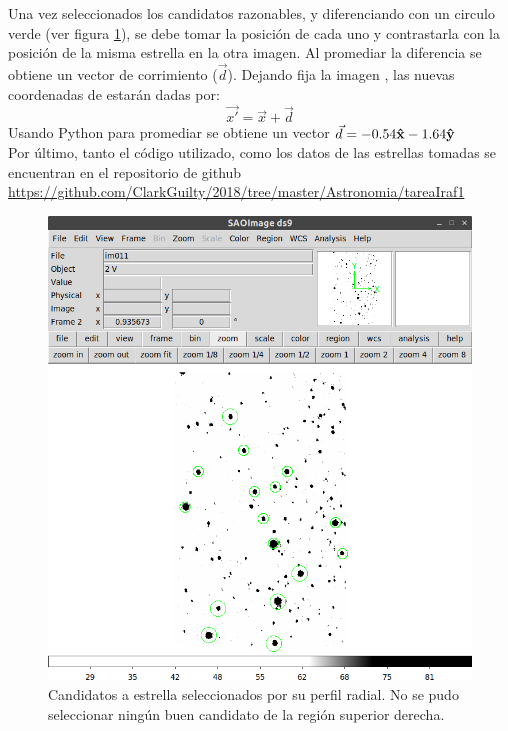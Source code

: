 \documentclass[12pt]{article}
\begin{document}
Una vez seleccionados los candidatos razonables, y diferenciando con un circulo verde (ver figura \ref{im07}), se debe tomar la posición de cada uno y contrastarla con la posición de la misma estrella en la otra imagen. Al promediar la diferencia se obtiene un vector de corrimiento ($\vec{d}$). Dejando fija la imagen , las nuevas coordenadas de  estarán dadas por:
\begin{equation}
\vec{x'}= \vec{x} + \vec{d}
\end{equation}
Usando Python para promediar se obtiene un vector $\vec{d} = -0.54\vu{x} -1.64\vu{y}$\\
Por último, tanto el código utilizado, como los datos de las estrellas tomadas se  encuentran en el repositorio de github \url{https://github.com/ClarkGuilty/2018/tree/master/Astronomia/tareaIraf1}

\begin{figure}[H]
  \centering
   \includegraphics[scale= 0.65]{im07.png}
  \caption{Candidatos a estrella seleccionados por su perfil radial. No se pudo seleccionar ningún buen candidato de la región superior derecha.}
  \label{im07}
\end{figure}



{}

\end{document}
